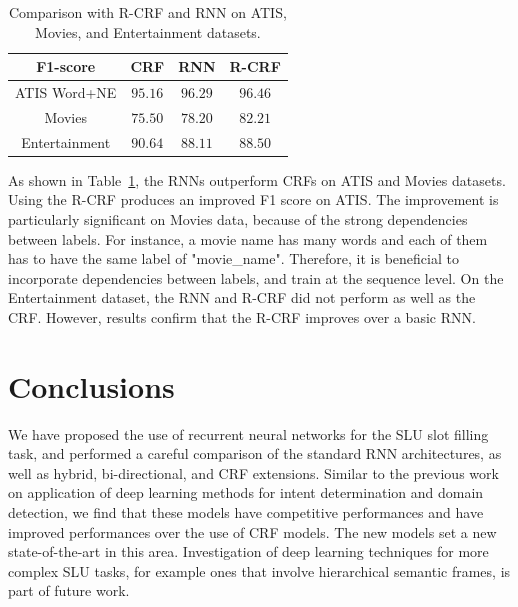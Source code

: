 \begin{table}
\centering
\begin{tabular}{|c|c|c|c|}
\hline
F1-score  &  CRF & RNN & R-CRF\\
\hline
ATIS Word+NE  &  $95.16$ &  $96.29$ &  $96.46$ \\
Movies  & $75.50$   & $78.20$  &  $82.21$ \\
Entertainment &  $90.64$ &  $88.11$  & $88.50$ \\
\hline
\end{tabular}
\caption[R-CRF versus RNN on ATIS, Movies, and Entertainment]{Comparison with R-CRF and RNN on ATIS, Movies, and Entertainment datasets.}
\label{tab:rcrf}
\end{table}

As shown in Table~\ref{tab:rcrf}, the RNNs outperform CRFs on ATIS and Movies
datasets. Using the R-CRF produces an improved F1 score on ATIS. The
improvement is particularly significant on Movies data, because of the strong
dependencies between labels. For instance, a movie name has many words and each
of them has to have the same label of "movie\_name". Therefore, it is beneficial
to incorporate dependencies between labels, and train at the sequence level. On
the Entertainment dataset, the RNN and R-CRF did not perform as well as the
CRF. However, results confirm that the R-CRF improves over a basic RNN. 

\section{Conclusions}
\label{sec:conclu}

We have proposed the use of recurrent neural networks for the SLU slot filling
task, and performed a careful comparison of the standard RNN architectures, as
well as hybrid, bi-directional, and CRF extensions. Similar to the previous
work on application of deep learning methods for intent determination and
domain detection, we find that these models have competitive performances and
have improved performances over the use of CRF models. The new models set a new
state-of-the-art in this area. Investigation of deep learning techniques for
more complex SLU tasks, for example ones that involve hierarchical semantic
frames, is part of future work.

